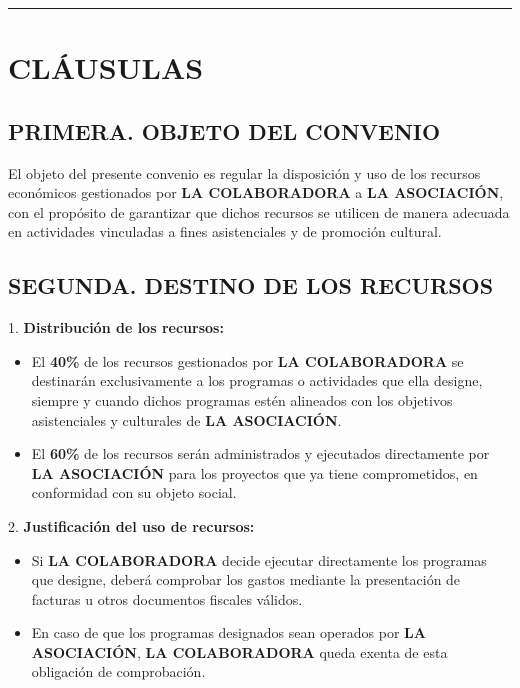 \documentclass[a4paper,12pt]{article}
\begin{document}
\vspace{0.5cm}

\hrule

\vspace{0.5cm}

\section*{CLÁUSULAS}

\subsection*{PRIMERA. OBJETO DEL CONVENIO}

El objeto del presente convenio es regular la disposición y uso de los recursos económicos gestionados por \textbf{LA COLABORADORA} a \textbf{LA ASOCIACIÓN}, con el propósito de garantizar que dichos recursos se utilicen de manera adecuada en actividades vinculadas a fines asistenciales y de promoción cultural.

\subsection*{SEGUNDA. DESTINO DE LOS RECURSOS}

1. \textbf{Distribución de los recursos:}
    \begin{itemize}
        \item El \textbf{40\%} de los recursos gestionados por \textbf{LA COLABORADORA} se destinarán exclusivamente a los programas o actividades que ella designe, siempre y cuando dichos programas estén alineados con los objetivos asistenciales y culturales de \textbf{LA ASOCIACIÓN}.
        \item El \textbf{60\%} de los recursos serán administrados y ejecutados directamente por \textbf{LA ASOCIACIÓN} para los proyectos que ya tiene comprometidos, en conformidad con su objeto social.
    \end{itemize}

2. \textbf{Justificación del uso de recursos:}
    \begin{itemize}
        \item Si \textbf{LA COLABORADORA} decide ejecutar directamente los programas que designe, deberá comprobar los gastos mediante la presentación de facturas u otros documentos fiscales válidos.
        \item En caso de que los programas designados sean operados por \textbf{LA ASOCIACIÓN}, \textbf{LA COLABORADORA} queda exenta de esta obligación de comprobación.
    \end{itemize}
\end{document}
